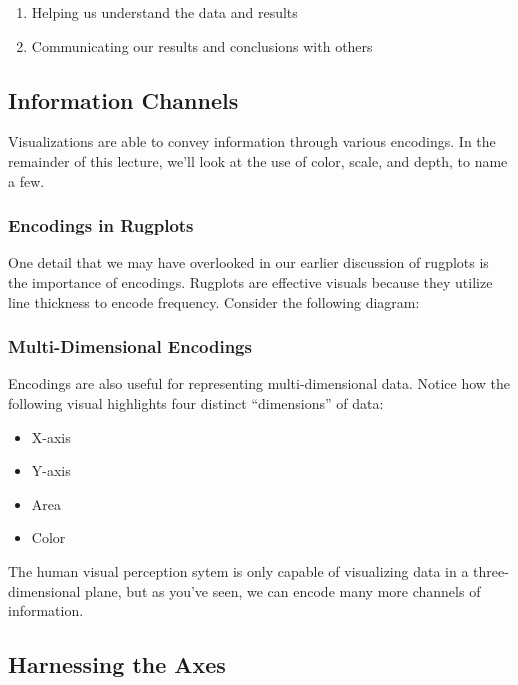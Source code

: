 \documentclass[
  letterpaper,
  DIV=11,
  numbers=noendperiod]{scrreprt}
\providecommand{\tightlist}{%
  \setlength{\itemsep}{0pt}\setlength{\parskip}{0pt}}\usepackage{longtable,booktabs,array}
\begin{document}
\begin{enumerate}
\def\labelenumi{\arabic{enumi}.}
\tightlist
\item
  Helping us understand the data and results
\item
  Communicating our results and conclusions with others
\end{enumerate}

\hypertarget{information-channels}{%
\subsection{Information Channels}\label{information-channels}}

Visualizations are able to convey information through various encodings.
In the remainder of this lecture, we'll look at the use of color, scale,
and depth, to name a few.

\hypertarget{encodings-in-rugplots}{%
\subsubsection{Encodings in Rugplots}\label{encodings-in-rugplots}}

One detail that we may have overlooked in our earlier discussion of
rugplots is the importance of encodings. Rugplots are effective visuals
because they utilize line thickness to encode frequency. Consider the
following diagram:

\hypertarget{multi-dimensional-encodings}{%
\subsubsection{Multi-Dimensional
Encodings}\label{multi-dimensional-encodings}}

Encodings are also useful for representing multi-dimensional data.
Notice how the following visual highlights four distinct ``dimensions''
of data:

\begin{itemize}
\tightlist
\item
  X-axis
\item
  Y-axis
\item
  Area
\item
  Color
\end{itemize}

The human visual perception sytem is only capable of visualizing data in
a three-dimensional plane, but as you've seen, we can encode many more
channels of information.

\hypertarget{harnessing-the-axes}{%
\subsection{Harnessing the Axes}\label{harnessing-the-axes}}
\end{document}
